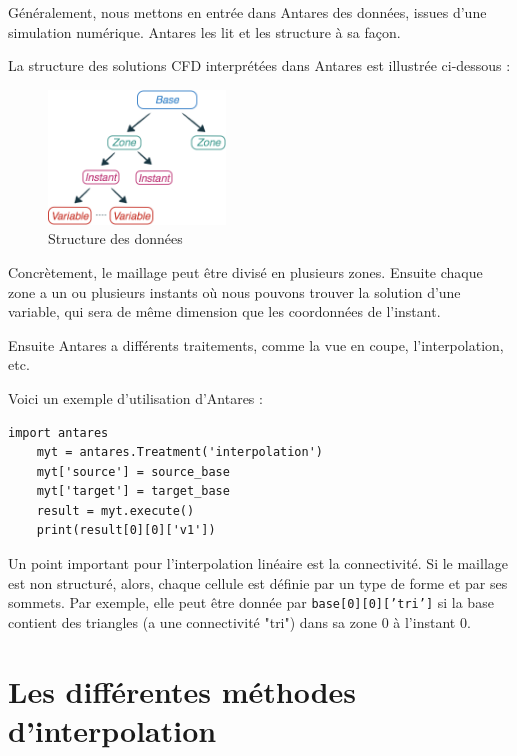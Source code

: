 Généralement, nous mettons en entrée dans Antares des données, issues d'une simulation numérique. Antares les lit et les structure à sa façon.

La structure des solutions CFD interprétées dans Antares est illustrée ci-dessous :

\begin{figure}[ht!]
\centering
\includegraphics[width=0.42\textwidth]{images/data_structure_1.png}
\caption{Structure des données}
\end{figure}

Concrètement, le maillage peut être divisé en plusieurs zones.
Ensuite chaque zone a un ou plusieurs instants où nous pouvons trouver la solution d'une variable, qui sera de même dimension que les coordonnées de l'instant.

Ensuite Antares a différents traitements, comme la vue en coupe, l'interpolation, etc.

Voici un exemple d'utilisation d'Antares :

\begin{lstlisting}[caption=Exemple simple d'utilisation d'Antares pour interpoler, label={lst:antares_2}]
    import antares
    myt = antares.Treatment('interpolation')
    myt['source'] = source_base
    myt['target'] = target_base
    result = myt.execute()
    print(result[0][0]['v1'])
\end{lstlisting}

Un point important pour l'interpolation linéaire est la connectivité. Si le maillage est non structuré, alors, chaque cellule est définie par un type de forme et par ses sommets. Par exemple, elle peut être donnée par \texttt{base[0][0]['tri']} si la base contient des triangles (a une connectivité "tri") dans sa zone 0 à l'instant 0.


\section{Les différentes méthodes d'interpolation}

